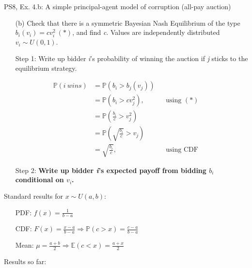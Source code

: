 \begin{frame}{PS8, Ex. 4.b: A simple principal-agent model of corruption (all-pay auction)}
    \begin{itemize}
      \item[(b)] Check that there is a symmetric Bayesian Nash Equilibrium of the type $b_i(v_i) = cv_i^2\ (*)$, and find \textit{c}. Values are independently distributed $v_i\sim U(0, 1)$.
    \end{itemize} \vspace{-8pt}
    \begin{multicols}{2}
      \begin{itemize}
        \item[Step 1:] Write up bidder \textit{i}'s probability of winning the auction if \textit{j} sticks to the equilibrium strategy.
      \end{itemize} \vspace{-8pt}
      \begin{align*}
        \mathbb{P}(i\ wins)&=\mathbb{P}(b_i>b_j(v_j))\\
                           &=\mathbb{P}(b_i>cv_j^2),&&\text{using }(*)\\
                           &=\mathbb{P}\left(\frac{b_i}{c}>v_j^2\right)\\
                           &=\mathbb{P}\left(\sqrt{\frac{b_i}{c}}>v_j\right)\\
                           &=\sqrt{\frac{b_i}{c}},&&\text{using CDF}
      \end{align*} \vspace{-8pt}
      \begin{itemize}
        \item[Step 2:] \textbf{Write up bidder \textit{i}'s expected payoff from bidding $b_i$ conditional on $v_i$.}
      \end{itemize}
      \vfill\null\columnbreak
      Standard results for $x\sim U(a, b):$ \vspace{-6pt}
      \begin{itemize}
        \item[PDF:] $f(x)=\frac{1}{b-a}$
        \item[CDF:] $F(x)=\frac{x-a}{b-a}\Rightarrow\mathbb{P}(c>x)=\frac{c-a}{b-a}$
        \item[Mean:] $\mu=\frac{a+b}{2}\Rightarrow\mathbb{E}(c<x)=\frac{a+x}{2}$
      \end{itemize}
      \vspace{-6pt}
      Results so far: \vspace{-6pt}

\end{multicols}
\end{frame}
